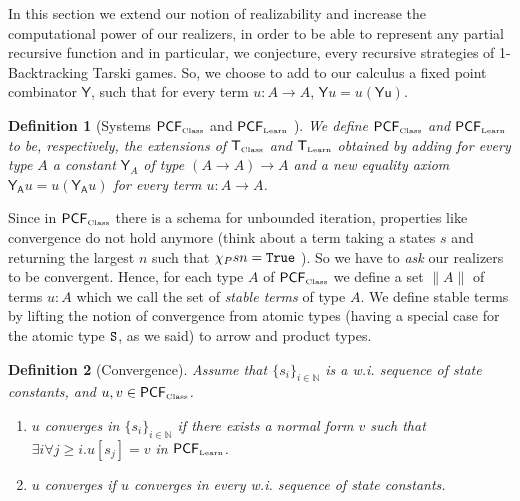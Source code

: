 \documentclass[copyright,creativecommons]{eptcs}
\newcommand{\State}                    { {\tt S} }
\newcommand{\NatSet}                   {\mathbb{N}}
\newcommand{\SystemT}                  {\mathsf{T}}
\newcommand{\True}                     { {\tt{True}} }
\newcommand{\Class}                    {\mbox{\tiny Class}}
\newcommand{\Learn}                    {\mbox{\tiny Learn}}
\newcommand{\SystemTClass}             {{\SystemT_{\Class}}}
\newcommand{\SystemTLearn}             {{\SystemT_{\Learn}}}
\newcommand{\PRclass}                    {{\mathsf{PCF}_{\Class}}}
\newcommand{\PRlearn}                    {{\mathsf{PCF}_{\Learn}}}
\newtheorem{definition}{Definition}
\begin{document}
In this section we extend our notion of realizability and increase the computational power of our realizers, in order to be able to represent any partial recursive function and in particular, we conjecture, every recursive strategies of 1-Backtracking Tarski games. So, we choose to add to our calculus a fixed point combinator $\mathsf{Y}$, such that for every term $u:A\rightarrow A$, $\mathsf{Y}u=u(\mathsf{Yu})$. 

\begin{definition}[Systems $\PRclass$ and $\PRlearn$ ]
We define $\PRclass$ and $\PRlearn$ to be, respectively, the extensions of $\SystemTClass$ and $\SystemTLearn$ obtained by adding for every type $A$ a constant $\mathsf{Y}_A$ of type $(A\rightarrow A)\rightarrow A$ and a new equality axiom $\mathsf{Y_A}u=u(\mathsf{Y_A}u)$ for every term $u: A\rightarrow A$.

\end{definition}

Since in $\PRclass$ there is a schema for unbounded iteration, properties like convergence do not hold anymore (think about a term taking a states $s$ and returning the largest $n$ such that $\chi_Psn=\True$ ). So we have to {\em ask} our realizers to be convergent. Hence, for each type $A$ of $\PRclass$ we define a set $\|A\|$  of
terms $u: A$ which we call the set of {\em stable terms} of
type $A$. We define stable terms by lifting the notion of
convergence from atomic types (having a special case for the atomic
type $\State$, as we said) to arrow and product types.


\begin{definition}[Convergence]
\label{definition-Convergence2} Assume
that $\{s_i\}_{i\in\NatSet} $ is a w.i. sequence of state constants,
and $u, v \in \PRclass$.
\begin{enumerate}

\item
  $u$ converges in $\{s_i\}_{i\in\NatSet}$ if there exists a normal form $v$ such that $\exists i
\forall j\geq i.u[s_j]=v$ in $\PRlearn$.

\item
$u$ converges if $u$ converges in every w.i. sequence of state constants.
\end{enumerate}
\end{definition}
\end{document}

